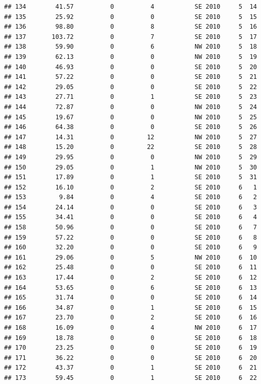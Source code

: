 \documentclass[
]{article}
\begin{document}
\begin{verbatim}
## 134        41.57          0          4           SE 2010     5  14
## 135        25.92          0          0           SE 2010     5  15
## 136        98.80          0          8           SE 2010     5  16
## 137       103.72          0          7           SE 2010     5  17
## 138        59.90          0          6           NW 2010     5  18
## 139        62.13          0          0           NW 2010     5  19
## 140        46.93          0          0           SE 2010     5  20
## 141        57.22          0          0           SE 2010     5  21
## 142        29.05          0          0           SE 2010     5  22
## 143        27.71          0          1           SE 2010     5  23
## 144        72.87          0          0           NW 2010     5  24
## 145        19.67          0          0           NW 2010     5  25
## 146        64.38          0          0           SE 2010     5  26
## 147        14.31          0         12           NW 2010     5  27
## 148        15.20          0         22           SE 2010     5  28
## 149        29.95          0          0           NW 2010     5  29
## 150        29.05          0          1           NW 2010     5  30
## 151        17.89          0          1           SE 2010     5  31
## 152        16.10          0          2           SE 2010     6   1
## 153         9.84          0          4           SE 2010     6   2
## 154        24.14          0          0           SE 2010     6   3
## 155        34.41          0          0           SE 2010     6   4
## 158        50.96          0          0           SE 2010     6   7
## 159        57.22          0          0           SE 2010     6   8
## 160        32.20          0          0           SE 2010     6   9
## 161        29.06          0          5           NW 2010     6  10
## 162        25.48          0          0           SE 2010     6  11
## 163        17.44          0          2           SE 2010     6  12
## 164        53.65          0          6           SE 2010     6  13
## 165        31.74          0          0           SE 2010     6  14
## 166        34.87          0          1           SE 2010     6  15
## 167        23.70          0          2           SE 2010     6  16
## 168        16.09          0          4           NW 2010     6  17
## 169        18.78          0          0           SE 2010     6  18
## 170        23.25          0          0           SE 2010     6  19
## 171        36.22          0          0           SE 2010     6  20
## 172        43.37          0          1           SE 2010     6  21
## 173        59.45          0          1           SE 2010     6  22

\end{verbatim}
\end{document}
